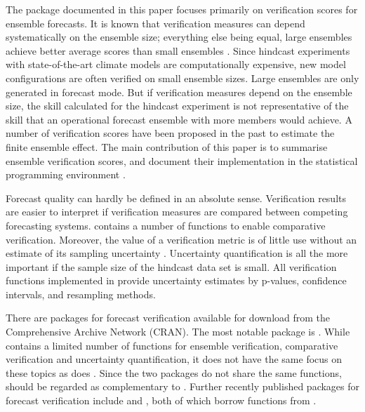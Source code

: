 \documentclass[article]{jss}\usepackage[]{graphicx}\usepackage[]{color}
\begin{document}
The  package  documented in this paper focuses primarily on verification scores for ensemble forecasts.
It is known that verification measures can depend systematically on the ensemble size; everything else being equal, large ensembles achieve better average scores than small ensembles \citep{buizza1998impact}.
Since hindcast experiments with state-of-the-art climate models are computationally expensive, 
new model configurations are often verified on small ensemble sizes.
Large ensembles are only generated in forecast mode.
But if verification measures depend on the ensemble size, the skill calculated for the hindcast experiment is not representative of the skill that an operational forecast ensemble with more members would achieve.
A number of verification scores have been proposed in the past to estimate the finite ensemble effect.
The main contribution of this paper is to summarise ensemble verification scores, and document their implementation in the  statistical programming environment \citep{R2015}.


Forecast quality can hardly be defined in an absolute sense.
Verification results are easier to interpret if verification measures are compared between competing forecasting systems.
 contains a number of functions to enable comparative verification. 
Moreover, the value of a verification metric is of little use without an estimate of its sampling uncertainty \citep{jolliffe2007uncertainty}.
Uncertainty quantification is all the more important if the sample size of the hindcast data set is small.  
All verification functions implemented in  provide uncertainty estimates by p-values, confidence intervals, and resampling methods.


There are packages for forecast verification available for download from the Comprehensive  Archive Network (CRAN).
The most notable package is  \citep{cran_verification}. 
While  contains a limited number of functions for ensemble verification, comparative verification and uncertainty quantification, it does not have the same focus on these topics as does .
Since the two packages do not share the same functions,  should be regarded as complementary to .
Further recently published  packages for forecast verification include  \citep{cran_easyverification} and  \citep{cran_s2dverification}, both of which borrow functions from .
\end{document}
